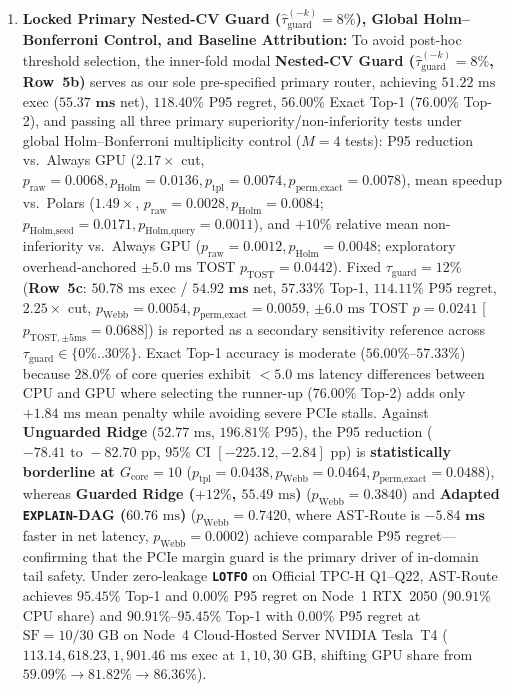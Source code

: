 \documentclass[10pt,a4paper]{article}
\begin{document}
\begin{enumerate}[leftmargin=1.5em,itemsep=1pt]
$16.50\times$ P95 cut), AST-Route achieves $\mathbf{52.74\text{ ms}}$ exec ($\mathbf{56.89\text{ ms}}$ net) and cuts \texttt{C3} P95 regret by $\mathbf{2.77\times}$ ($338.00\%\rightarrow \mathbf{121.84\%}, p_{\text{Webb}}=0.0042$).
    \item \textbf{Locked Primary Nested-CV Guard ($\hat{\tau}_{\text{guard}}^{(-k)}=8\%$), Global Holm--Bonferroni Control, and Baseline Attribution:} To avoid post-hoc threshold selection, the inner-fold modal \textbf{Nested-CV Guard ($\hat{\tau}_{\text{guard}}^{(-k)}=8\%$, Row~5b)} serves as our sole pre-specified primary router, achieving $51.22\text{ ms}$ exec ($\mathbf{55.37\text{ ms}}$ net), $\mathbf{118.40\%}$ P95 regret, $\mathbf{56.00\%}$ Exact Top-1 ($\mathbf{76.00\%}$ Top-2), and passing all three primary superiority/non-inferiority tests under global Holm--Bonferroni multiplicity control ($M=4$ tests): P95 reduction vs.\ Always GPU ($2.17\times$ cut, $p_{\text{raw}}=0.0068, p_{\text{Holm}}=0.0136, p_{\text{tpl}}=0.0074, p_{\text{perm,exact}}=0.0078$), mean speedup vs.\ Polars ($1.49\times$, $p_{\text{raw}}=0.0028, p_{\text{Holm}}=0.0084$; $p_{\text{Holm,seed}}=0.0171, p_{\text{Holm,query}}=0.0011$), and $+10\%$ relative mean non-inferiority vs.\ Always GPU ($p_{\text{raw}}=0.0012, p_{\text{Holm}}=0.0048$; exploratory overhead-anchored $\pm 5.0\text{ ms}$ TOST $p_{\text{TOST}}=0.0442$). Fixed $\tau_{\text{guard}}=12\%$ (\textbf{Row~5c}: $50.78\text{ ms}$ exec / $\mathbf{54.92\text{ ms}}$ net, $\mathbf{57.33\%}$ Top-1, $\mathbf{114.11\%}$ P95 regret, $2.25\times$ cut, $p_{\text{Webb}}=0.0054, p_{\text{perm,exact}}=0.0059$, $\pm 6.0\text{ ms}$ TOST $p=0.0241$ [$p_{\text{TOST},\pm 5\text{ms}}=0.0688$]) is reported as a secondary sensitivity reference across $\tau_{\text{guard}}\in\{0\%..30\%\}$. Exact Top-1 accuracy is moderate ($56.00\%\text{--}57.33\%$) because $28.0\%$ of core queries exhibit $<5.0\text{ ms}$ latency differences between CPU and GPU where selecting the runner-up ($76.00\%$ Top-2) adds only $+1.84\text{ ms}$ mean penalty while avoiding severe PCIe stalls. Against \textbf{Unguarded Ridge} ($52.77\text{ ms}$, $196.81\%$ P95), the P95 reduction ($-78.41\text{ to }-82.70\text{ pp}$, 95\% CI $[-225.12,-2.84]\text{ pp}$) is \textbf{statistically borderline at $G_{\text{core}}=10$} ($p_{\text{tpl}}=0.0438, p_{\text{Webb}}=0.0464, p_{\text{perm,exact}}=0.0488$), whereas \textbf{Guarded Ridge ($+12\%$, $55.49\text{ ms}$)} ($p_{\text{Webb}}=0.3840$) and \textbf{Adapted \texttt{EXPLAIN}-DAG ($60.76\text{ ms}$)} ($p_{\text{Webb}}=0.7420$, where AST-Route is $\mathbf{-5.84\text{ ms}}$ faster in net latency, $p_{\text{Webb}}=0.0002$) achieve comparable P95 regret---confirming that the PCIe margin guard is the primary driver of in-domain tail safety. Under zero-leakage \textbf{\texttt{LOTFO}} on Official TPC-H Q1--Q22, AST-Route achieves $\mathbf{95.45\%}$ Top-1 and $\mathbf{0.00\%}$ P95 regret on Node~1 RTX~2050 ($90.91\%$ CPU share) and $\mathbf{90.91\%\text{--}95.45\%}$ Top-1 with $\mathbf{0.00\%}$ P95 regret at $\text{SF}=10/30\text{ GB}$ on Node~4 Cloud-Hosted Server NVIDIA Tesla~T4 ($113.14, 618.23, 1{,}901.46\text{ ms}$ exec at $1, 10, 30\text{ GB}$, shifting GPU share from $\mathbf{59.09\%}\rightarrow\mathbf{81.82\%}\rightarrow\mathbf{86.36\%}$).

\end{enumerate}
\end{document}
